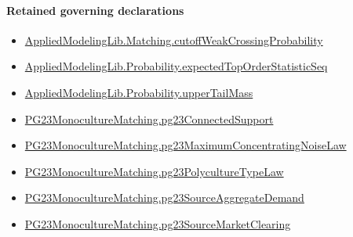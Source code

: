 \documentclass[10pt]{article}
\begin{document}
\paragraph{Retained governing declarations}
\begin{itemize}\raggedright
\item \hyperlink{governing-declaration-b9347ec8cbc98b34}{Applied\allowbreak{}Modeling\allowbreak{}Lib.\allowbreak{}Matching.\allowbreak{}cutoff\allowbreak{}Weak\allowbreak{}Crossing\allowbreak{}Probability}
\item \hyperlink{governing-declaration-0b73f814382be426}{Applied\allowbreak{}Modeling\allowbreak{}Lib.\allowbreak{}Probability.\allowbreak{}expected\allowbreak{}Top\allowbreak{}Order\allowbreak{}Statistic\allowbreak{}Seq}
\item \hyperlink{governing-declaration-f983ca9c59dc317f}{Applied\allowbreak{}Modeling\allowbreak{}Lib.\allowbreak{}Probability.\allowbreak{}upper\allowbreak{}Tail\allowbreak{}Mass}
\item \hyperlink{paper-prerequisite-3ea91dd17eec5e64}{PG23\allowbreak{}Monoculture\allowbreak{}Matching.\allowbreak{}pg23\allowbreak{}Connected\allowbreak{}Support}
\item \hyperlink{paper-prerequisite-8df4ad9724d0cb72}{PG23\allowbreak{}Monoculture\allowbreak{}Matching.\allowbreak{}pg23\allowbreak{}Maximum\allowbreak{}Concentrating\allowbreak{}Noise\allowbreak{}Law}
\item \hyperlink{paper-prerequisite-57a6e28ae64a74da}{PG23\allowbreak{}Monoculture\allowbreak{}Matching.\allowbreak{}pg23\allowbreak{}Polyculture\allowbreak{}Type\allowbreak{}Law}
\item \hyperlink{paper-prerequisite-3fb2e1ac28891e7d}{PG23\allowbreak{}Monoculture\allowbreak{}Matching.\allowbreak{}pg23\allowbreak{}Source\allowbreak{}Aggregate\allowbreak{}Demand}
\item \hyperlink{paper-prerequisite-55bbf5d44984bdf1}{PG23\allowbreak{}Monoculture\allowbreak{}Matching.\allowbreak{}pg23\allowbreak{}Source\allowbreak{}Market\allowbreak{}Clearing}
\end{itemize}
\end{document}
